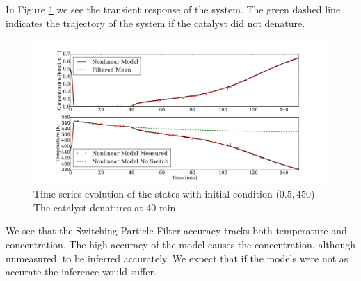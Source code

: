 \documentclass[../masters.tex]{subfiles}
\begin{document}
In Figure \ref{fig_spf_m1_t} we see the transient response of the system. The green dashed line indicates the trajectory of the system if the catalyst did not denature.  
\begin{figure}[H] 
\centering
\includegraphics[scale=0.3]{spf_m1_t.pdf}
\caption{Time series evolution of the states with initial condition ($0.5, 450$). The catalyst denatures at 40 min.}
\label{fig_spf_m1_t}
\end{figure}
We see that the Switching Particle Filter accuracy tracks both temperature and concentration. The high accuracy of the model causes the concentration, although unmeasured, to be inferred accurately. We expect that if the models were not as accurate the inference would suffer.
\end{document}
